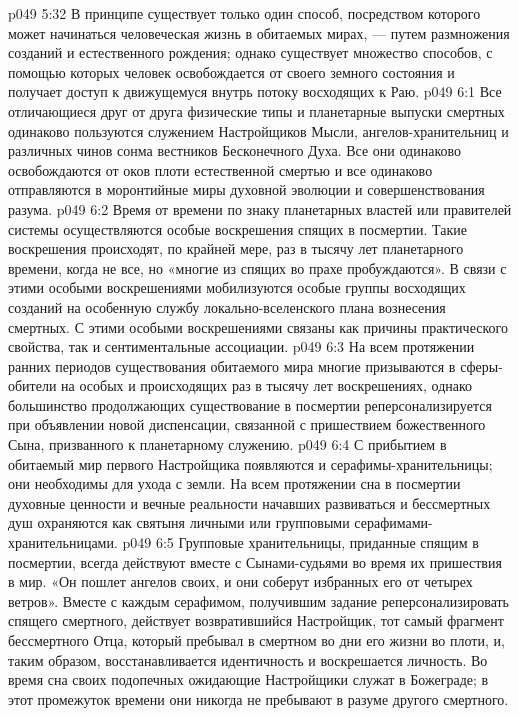\vs p049 5:32 \bibnobreakspace {} В принципе существует только один способ, посредством которого может начинаться человеческая жизнь в обитаемых мирах, --- путем размножения созданий и естественного рождения; однако существует множество способов, с помощью которых человек освобождается от своего земного состояния и получает доступ к движущемуся внутрь потоку восходящих к Раю.
\vs p049 6:1 Все отличающиеся друг от друга физические типы и планетарные выпуски смертных одинаково пользуются служением Настройщиков Мысли, ангелов\hyp{}хранительниц и различных чинов сонма вестников Бесконечного Духа. Все они одинаково освобождаются от оков плоти естественной смертью и все одинаково отправляются в моронтийные миры духовной эволюции и совершенствования разума.
\vs p049 6:2 Время от времени по знаку планетарных властей или правителей системы осуществляются особые воскрешения спящих в посмертии. Такие воскрешения происходят, по крайней мере, раз в тысячу лет планетарного времени, когда не все, но «многие из спящих во прахе пробуждаются». В связи с этими особыми воскрешениями мобилизуются особые группы восходящих созданий на особенную службу локально\hyp{}вселенского плана вознесения смертных. С этими особыми воскрешениями связаны как причины практического свойства, так и сентиментальные ассоциации.
\vs p049 6:3 На всем протяжении ранних периодов существования обитаемого мира многие призываются в сферы\hyp{}обители на особых и происходящих раз в тысячу лет воскрешениях, однако большинство продолжающих существование в посмертии реперсонализируется при объявлении новой диспенсации, связанной с пришествием божественного Сына, призванного к планетарному служению.
\vs p049 6:4 \bibnobreakspace {} С прибытием в обитаемый мир первого Настройщика появляются и серафимы\hyp{}хранительницы; они необходимы для ухода с земли. На всем протяжении сна в посмертии духовные ценности и вечные реальности начавших развиваться и бессмертных душ охраняются как святыня личными или групповыми серафимами\hyp{}хранительницами.
\vs p049 6:5 Групповые хранительницы, приданные спящим в посмертии, всегда действуют вместе с Сынами\hyp{}судьями во время их пришествия в мир. «Он пошлет ангелов своих, и они соберут избранных его от четырех ветров». Вместе с каждым серафимом, получившим задание реперсонализировать спящего смертного, действует возвратившийся Настройщик, тот самый фрагмент бессмертного Отца, который пребывал в смертном во дни его жизни во плоти, и, таким образом, восстанавливается идентичность и воскрешается личность. Во время сна своих подопечных ожидающие Настройщики служат в Божеграде; в этот промежуток времени они никогда не пребывают в разуме другого смертного.
